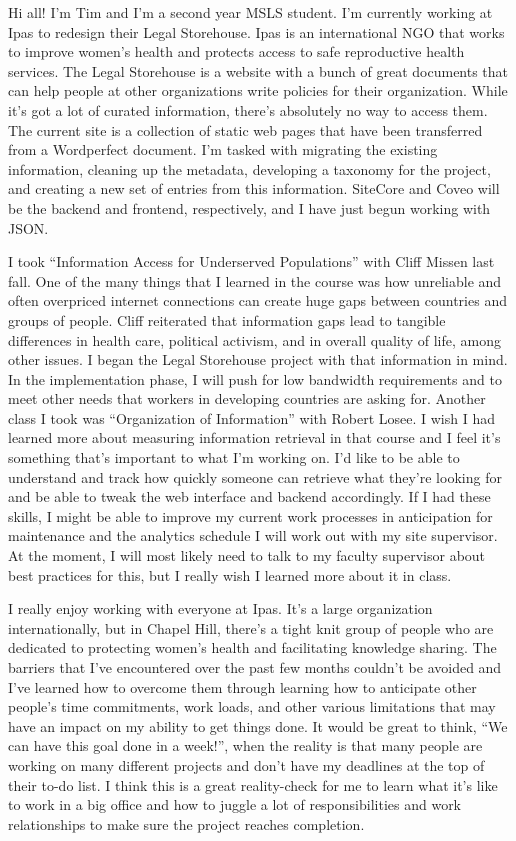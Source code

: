 \documentclass{article}
\begin{document}
\begin{displayquote}
Hi all! I'm Tim and I'm a second year MSLS student. I'm currently working at Ipas to redesign their Legal Storehouse. Ipas is an international NGO that works to improve women’s health and protects access to safe reproductive health services. The Legal Storehouse is a website with a bunch of great documents that can help people at other organizations write policies for their organization. While it's got a lot of curated information, there's absolutely no way to access them. The current site is a collection of static web pages that have been transferred from a Wordperfect document. I'm tasked with migrating the existing information, cleaning up the metadata, developing a taxonomy for the project, and creating a new set of entries from this information. SiteCore and Coveo will be the backend and frontend, respectively, and I have just begun working with JSON.

I took ``Information Access for Underserved Populations'' with Cliff Missen last fall. One of the many things that I learned in the course was how unreliable and often overpriced internet connections can create huge gaps between countries and groups of people. Cliff reiterated that information gaps lead to tangible differences in health care, political activism, and in overall quality of life, among other issues. I began the Legal Storehouse project with that information in mind. In the implementation phase, I will push for low bandwidth requirements and to meet other needs that workers in developing countries are asking for. Another class I took was “Organization of Information” with Robert Losee. I wish I had learned more about measuring information retrieval in that course and I feel it’s something that’s important to what I’m working on. I’d like to be able to understand and track how quickly someone can retrieve what they’re looking for and be able to tweak the web interface and backend accordingly. If I had these skills, I might be able to improve my current work processes in anticipation for maintenance and the analytics schedule I will work out with my site supervisor. At the moment, I will most likely need to talk to my faculty supervisor about best practices for this, but I really wish I learned more about it in class.

I really enjoy working with everyone at Ipas. It's a large organization internationally, but in Chapel Hill, there’s a tight knit group of people who are dedicated to protecting women’s health and facilitating knowledge sharing. The barriers that I've encountered over the past few months couldn't be avoided and I've learned how to overcome them through learning how to anticipate other people’s time commitments, work loads, and other various limitations that may have an impact on my ability to get things done. It would be great to think, ``We can have this goal done in a week!'', when the reality is that many people are working on many different projects and don’t have my deadlines at the top of their to-do list. I think this is a great reality-check for me to learn what it’s like to work in a big office and how to juggle a lot of responsibilities and work relationships to make sure the project reaches completion.
\end{displayquote}
\end{document}
